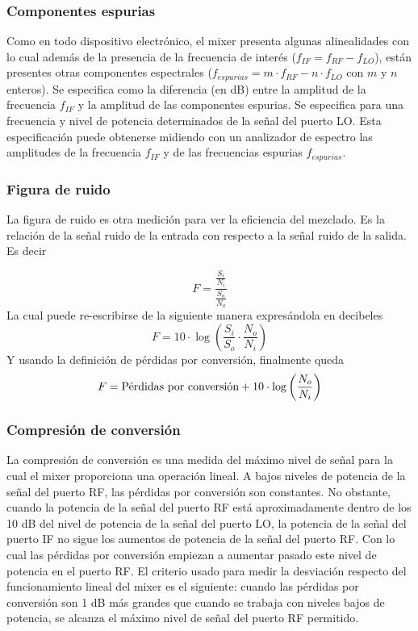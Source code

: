 \documentclass[a4paper,10pt]{article}
\begin{document}
		\subsubsection{Componentes espurias}
		Como en todo dispositivo electr\'onico, el mixer presenta algunas alinealidades con lo cual adem\'as de la presencia de la frecuencia de inter\'es ($f_{IF}=f_{RF}-f_{LO}$), est\'an presentes otras componentes espectrales ($f_{espurias}=m\cdot f_{RF}-n\cdot f_{LO}$ con $m$ y $n$ enteros). Se especifica como la diferencia (en dB) entre la amplitud de la frecuencia $f_{IF}$ y la amplitud de las componentes espurias. Se especifica para una frecuencia y nivel de potencia determinados de la señal del puerto LO.
		Esta especificaci\'on puede obtenerse midiendo con un analizador de espectro las amplitudes de la frecuencia $f_{IF}$ y de las frecuencias espurias $f_{espurias}$.

		\subsubsection{Figura de ruido}
		\indent La figura de ruido es otra medición para ver la eficiencia del 
		mezclado. Es la relación de la señal ruido de la entrada con respecto a
		la señal ruido de la salida. Es decir
		
		$$F=\frac{\frac{S_i}{N_i}}{\frac{S_o}{N_o}}$$
		La cual puede re-escribirse de la siguiente manera expres\'andola en decibeles 
		$$F=10\cdot\log\left(\frac{S_i}{S_o}\cdot\frac{N_o}{N_i}\right)$$
		Y usando la definici\'on de p\'erdidas por conversi\'on, finalmente queda
		$$F=\textmd{P\'erdidas por conversi\'on}+10\cdot\log\left(\frac{N_o}{N_i}\right)$$
		
		\subsubsection{Compresi\'on de conversi\'on}
		La compresi\'on de conversi\'on es una medida del m\'aximo nivel de se\~nal para la cual el mixer proporciona una operaci\'on lineal. A bajos niveles de potencia de la se\~nal del puerto RF, las p\'erdidas por conversi\'on son constantes. No obstante, cuando la potencia de la se\~nal del puerto RF est\'a aproximadamente dentro de los 10 dB del nivel de potencia de la se\~nal del puerto LO, la potencia de la se\~nal del puerto IF no sigue los aumentos de potencia de la se\~nal del puerto RF. Con lo cual las p\'erdidas por conversi\'on empiezan a aumentar pasado este nivel de potencia en el puerto RF. El criterio usado para medir la desviaci\'on respecto del funcionamiento lineal del mixer es el siguiente: cuando las p\'erdidas por conversi\'on son 1 dB m\'as grandes que cuando se trabaja con niveles bajos de potencia, se alcanza el m\'aximo nivel de se\~nal del puerto RF permitido. 
		
\end{document}
